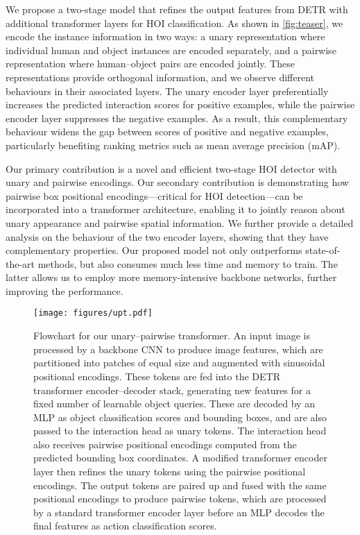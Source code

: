 \documentclass[10pt,twocolumn,letterpaper]{article}
\begin{document}
We propose a two-stage model that refines the output features from DETR with additional transformer layers for HOI classification. As shown in \cref{fig:teaser}, we encode the instance information in two ways: a unary representation where individual human and object instances are encoded separately, and a pairwise representation where human--object pairs are encoded jointly. These representations provide orthogonal information, and we observe different behaviours in their associated layers. The unary encoder layer preferentially increases the predicted interaction scores for positive examples, while the pairwise encoder layer suppresses the negative examples. As a result, this complementary behaviour widens the gap between scores of positive and negative examples, particularly benefiting ranking metrics such as mean average precision (mAP).

Our primary contribution is a novel and efficient two-stage HOI detector with unary and pairwise encodings. Our secondary contribution is demonstrating how pairwise box positional encodings---critical for HOI detection---can be incorporated into a transformer architecture, enabling it to jointly reason about unary appearance and pairwise spatial information. We further provide a detailed analysis on the behaviour of the two encoder layers, showing that they have complementary properties. Our proposed model not only outperforms state-of-the-art methods, but also consumes much less time and memory to train. The latter allows us to employ more memory-intensive backbone networks, further improving the performance.

\begin{figure*}[t]
\centering
\texttt{[image: figures/upt.pdf]}
\caption{Flowchart for our unary--pairwise transformer. An input image is processed by a backbone CNN to produce image features, which are partitioned into patches of equal size and augmented with sinusoidal positional encodings. These tokens are fed into the DETR~\cite{detr} transformer encoder--decoder stack, generating new features for a fixed number of learnable object queries. These are decoded by an MLP as object classification scores and bounding boxes, and are also passed to the interaction head as unary tokens. The interaction head also receives pairwise positional encodings computed from the predicted bounding box coordinates. A modified transformer encoder layer then refines the unary tokens using the pairwise positional encodings. The output tokens are paired up and fused with the same positional encodings to produce pairwise tokens, which are processed by a standard transformer encoder layer before an MLP decodes the final features as action classification scores.
}
\label{fig:diagram}
\end{figure*}
\end{document}

